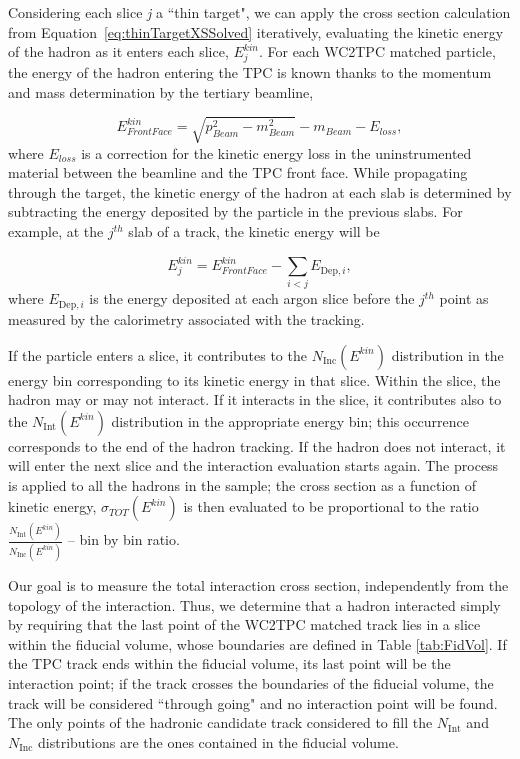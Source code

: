 \documentclass[aps,prl,twocolumn,showpacs,superscriptaddress,groupedaddress]{revtex4}  %
\begin{document}


Considering each slice {\emph{j}}  a ``thin target",  we can apply the cross section calculation from Equation~\ref{eq:thinTargetXSSolved} iteratively, evaluating the kinetic energy of the hadron as it enters each slice, $E_{j}^{kin}$.  For each WC2TPC matched particle, the energy of the hadron entering the TPC is known thanks to the momentum and mass determination by the tertiary beamline, 

\begin{equation}
 E^{kin}_{Front Face}  = \sqrt{p^2_{Beam} - m^2_{Beam}} - m_{Beam} - E_{loss},
\label{eq:enFF}
\end{equation}
where $E_{loss}$ is a correction for the kinetic energy loss in the uninstrumented material between the beamline and the TPC front face. While propagating through the target,  the kinetic energy of the hadron at each slab is determined by subtracting the energy deposited by the particle in the previous slabs. For example, at the $j^{th}$ slab of a track, the kinetic energy will be

\begin{equation}
 E_{j}^{kin} =  E^{kin}_{Front Face} - \sum_{i < j} E_{\text{Dep},i},
\label{eq:KEj}
\end{equation}
where $E_{\text{Dep},i}$ is the energy deposited at each argon slice before the $j^{th}$ point as measured by the calorimetry associated with the tracking.


If the particle enters a slice, it contributes to the $N_{\text{Inc}}( E^{kin})$ distribution in the energy bin corresponding to its kinetic energy in that slice.  Within the slice, the hadron may or may not interact. If it interacts in the slice, it  contributes also to the $N_{\text{Int}}(E^{kin})$ distribution in the appropriate energy bin; this occurrence corresponds to the end of the hadron tracking. If the hadron does not interact, it will enter the next slice and the interaction evaluation starts again.
The process is applied to all the hadrons in the sample; the cross section as a function of kinetic energy, $\sigma_{TOT}( E^{kin})$ is then evaluated to be proportional to the ratio $\frac{N_{\text{Int}}( E^{kin})}{N_{\text{Inc}}( E^{kin})}$ -- bin by bin ratio. 


Our goal is to measure the total interaction cross section, independently  from the topology of the interaction. Thus, we determine that a hadron interacted simply by requiring that the last point of the WC2TPC matched track lies in a slice within the fiducial volume, whose boundaries are defined in Table \ref{tab:FidVol}. If the TPC track ends within the fiducial volume, its last point will be the interaction point; if the track crosses the boundaries of the fiducial volume, the track will be considered ``through going" and no interaction point will be found. The only points of the hadronic candidate track considered to fill the  $N_{\text{Int}}$ and  $N_{\text{Inc}}$ distributions are the ones contained in the fiducial volume. 
 
\end{document}
